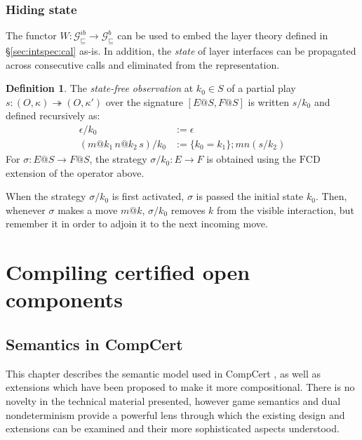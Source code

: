 \documentclass[11pt,oneside]{book}
\theoremstyle{definition}
\newtheorem{definition}[theorem]{Definition}
\newcommand{\gcat}{\mathcal{G}_{\sqsubseteq}}
\begin{document}
\section{Hiding state} \label{sec:gamesem:pack} %

The functor
$W : \gcat^{ib} \rightarrow \gcat^b$
can be used to embed the layer theory
defined in \S\ref{sec:intspec:cal} as-is.
In addition, the \emph{state} of layer interfaces
can be propagated across consecutive calls and
eliminated from the representation.

\begin{definition}
The \emph{state-free observation} at $k_0 \in S$
of a partial play
$s : (O, \kappa) \twoheadrightarrow (O, \kappa')$
over the signature $[E@S, F@S]$
is written $s/k_0$ and defined recursively as:
\begin{align*}
    \epsilon / k_0 &:= \epsilon \\
    (m@k_1 \, n@k_2 \, s) / k_0 &:=
      \{ k_0 = k_1 \} ; m n (s / k_2)
\end{align*}
For $\sigma : E@S \rightarrow F@S$,
the strategy $\sigma / k_0 : E \rightarrow F$
is obtained using the $\mathrm{FCD}$ extension
of the operator above.
\end{definition}

When the strategy $\sigma / k_0$ is first activated,
$\sigma$ is passed the initial state $k_0$.
Then, whenever $\sigma$ makes a move $m@k$,
$\sigma / k_0$ removes $k$ from the visible interaction,
but remember it in order to adjoin it to the next incoming move.



\part{Compiling certified open components} \label{part:compcerto}

\chapter{Semantics in CompCert} \label{sec:compcert-sem} %

This chapter describes the semantic model
used in CompCert \citep{compcert},
as well as extensions which have been proposed
to make it more compositional.
There is no novelty in the technical material presented,
however
game semantics and dual nondeterminism
provide a powerful lens
through which the existing design and extensions
can be examined
and their more sophisticated aspects understood.
\end{document}
